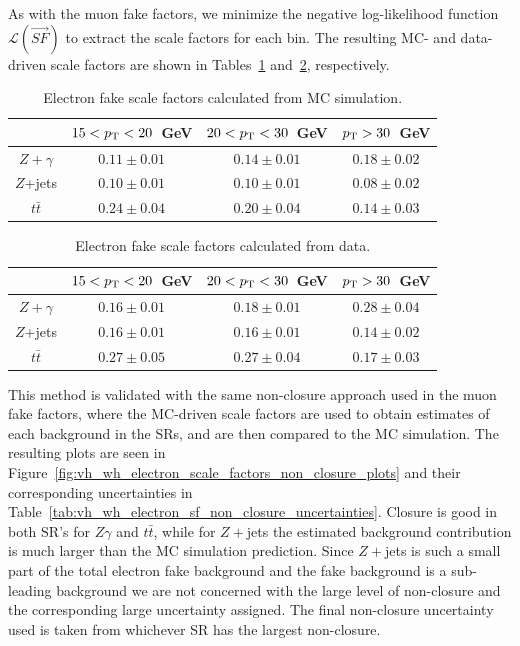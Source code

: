 As with the muon fake factors, we minimize the negative log-likelihood function $\mathcal{L}(\vec{SF})$ to extract the scale factors for each \pt{} bin. The resulting MC- and data-driven scale factors are shown in Tables~\ref{tab:vh_wh_electron_scale_factors_mc} and~\ref{tab:vh_wh_electron_scale_factors_dd}, respectively.

\begin{table}[htb]
  \centering
  \begin{tabular}{c|ccc}
  \hline
  & $15 < p_{\mathrm{T}} < 20$~GeV & $20 < p_{\mathrm{T}} <3 0$~GeV & $p_{\mathrm{T}} > 30$~GeV \\
  \hline
  $Z+\gamma$ & $0.11\pm 0.01$ & $0.14 \pm 0.01$ & $0.18 \pm 0.02$ \\
  $Z$+jets & $0.10 \pm 0.01$ & $0.10 \pm 0.01$ & $0.08 \pm 0.02$ \\
  $t\bar{t}$ & $0.24 \pm 0.04$ & $0.20 \pm 0.04$ & $0.14 \pm 0.03$ \\
  \hline
  \end{tabular}
  \caption{Electron fake scale factors calculated from MC simulation.}\label{tab:vh_wh_electron_scale_factors_mc}
\end{table}

\begin{table}[htb]
  \centering
  \begin{tabular}{c|ccc}
  \hline
  & $15 < p_{\mathrm{T}} < 20$~GeV & $20 < p_{\mathrm{T}} < 30$~GeV & $p_{\mathrm{T}} > 30$~GeV \\
  \hline
  $Z+\gamma$ & $0.16\pm 0.01$ & $0.18 \pm 0.01$ & $0.28 \pm 0.04$ \\
  $Z$+jets & $0.16 \pm 0.01$ & $0.16 \pm 0.01$ & $0.14 \pm 0.02$ \\
  $t\bar{t}$ & $0.27 \pm 0.05$ & $0.27 \pm 0.04$ & $0.17 \pm 0.03$ \\
  \hline
  \end{tabular}
  \caption{Electron fake scale factors calculated from data.}\label{tab:vh_wh_electron_scale_factors_dd}
\end{table}

This method is validated with the same non-closure approach used in the muon fake factors, where the MC-driven scale factors are used to obtain estimates of each background in the SRs, and are then compared to the MC simulation. The resulting plots are seen in Figure~\ref{fig:vh_wh_electron_scale_factors_non_closure_plots} and their corresponding uncertainties in Table~\ref{tab:vh_wh_electron_sf_non_closure_uncertainties}. Closure is good in both SR's for $Z\gamma$ and $t\bar{t}$, while for $Z+$jets the estimated background contribution is much larger than the MC simulation prediction. Since $Z+$jets is such a small part of the total electron fake background and the fake background is a sub-leading background we are not concerned with the large level of non-closure and the corresponding large uncertainty assigned. The final non-closure uncertainty used is taken from whichever SR has the largest non-closure.

